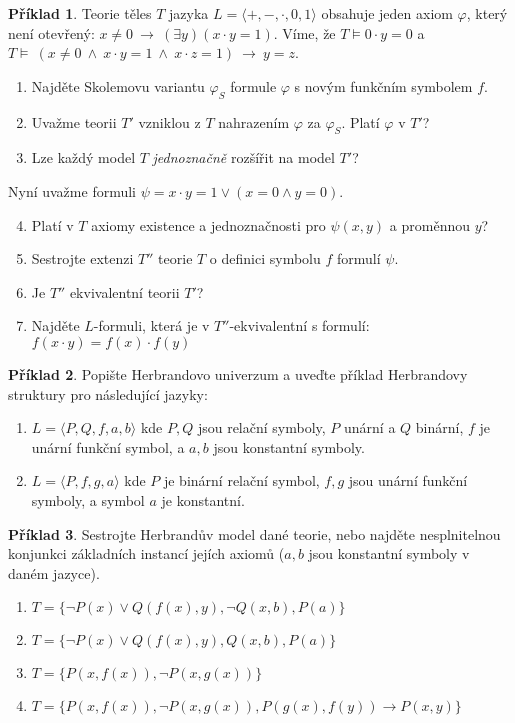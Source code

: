 \documentclass[a4paper]{article}
\theoremstyle{definition}
\newtheorem{problem}{Příklad}
\begin{document}
\medskip\begin{problem} %
Teorie těles $T$ jazyka $L=\langle +,-,\cdot,0,1\rangle$ obsahuje jeden axiom $\varphi$, který není otevřený: $x\neq 0\ \to\ (\exists y)(x\cdot y=1)$. Víme, že $T\models 0\cdot y=0$ a $T\models\ (x\ne 0\ \wedge\ x\cdot y=1\ \wedge\ x\cdot z=1)\ \to\ y=z$.
\begin{enumerate}
    \item Najděte Skolemovu variantu $\varphi_S$ formule $\varphi$ s novým funkčním symbolem $f$.
    \item Uvažme teorii $T'$ vzniklou z $T$ nahrazením $\varphi$ za $\varphi_S$. Platí $\varphi$ v $T'$?
    \item Lze každý model $T$ \emph{jednoznačně} rozšířit na model $T'$?
\end{enumerate}
Nyní uvažme formuli $\psi=x\cdot y=1\vee  (x=0 \wedge y=0)$.
\begin{enumerate}
    \setcounter{enumi}{3}
    \item Platí v $T$ axiomy existence a jednoznačnosti pro $\psi(x,y)$ a proměnnou $y$?
    \item Sestrojte extenzi $T''$ teorie $T$ o definici symbolu $f$ formulí $\psi$.
    \item Je $T''$ ekvivalentní teorii $T'$?
    \item Najděte $L$-formuli, která je v $T''$-ekvivalentní s formulí:
    $f(x\cdot y)=f(x)\cdot f(y)$
\end{enumerate}
\end{problem}


\medskip\begin{problem} Popište Herbrandovo univerzum a uveďte příklad Herbrandovy struktury pro následující jazyky:
\begin{enumerate}
    \item $L=\langle P,Q,f,a,b \rangle$ kde  $P,Q$ jsou relační symboly, $P$ unární a $Q$ binární, $f$ je unární funkční symbol, a $a,b$ jsou konstantní symboly.
    \item $L=\langle P,f,g,a \rangle$ kde $P$ je binární relační symbol, $f,g$ jsou unární funkční symboly, a symbol $a$ je konstantní.
\end{enumerate}
\end{problem}


\medskip\begin{problem} Sestrojte Herbrandův model dané teorie, nebo najděte nesplnitelnou konjunkci základních instancí jejích axiomů ($a,b$ jsou konstantní symboly v daném jazyce).
\begin{enumerate}
    \item $T=\{\neg P(x)\vee Q(f(x),y), \neg Q(x,b), P(a)\}$
    \item $T=\{\neg P(x)\vee Q(f(x),y), Q(x,b), P(a)\}$
    \item $T=\{P(x,f(x)),\neg P(x,g(x))\}$
    \item $T=\{P(x,f(x)),\neg P(x,g(x)), P(g(x),f(y)) \to P(x,y)\}$
\end{enumerate}
\end{problem}
\end{document}
